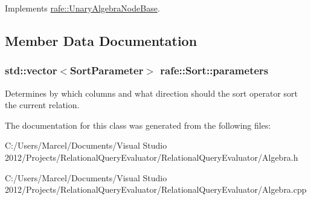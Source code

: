 Implements \hyperlink{classrafe_1_1_unary_algebra_node_base_a6f554aad7250a0f15730d10ae24e4a79}{rafe\+::\+Unary\+Algebra\+Node\+Base}.



\subsection{Member Data Documentation}
\hypertarget{classrafe_1_1_sort_a56fff2e57e874999e0bc44772b090129}{
\subsubsection[{parameters}]{\setlength{\rightskip}{0pt plus 5cm}std\+::vector$<${\bf Sort\+Parameter}$>$ rafe\+::\+Sort\+::parameters}}\label{classrafe_1_1_sort_a56fff2e57e874999e0bc44772b090129}
Determines by which columns and what direction should the sort operator sort the current relation. 

The documentation for this class was generated from the following files\+:\begin{DoxyCompactItemize}
\item 
C\+:/\+Users/\+Marcel/\+Documents/\+Visual Studio 2012/\+Projects/\+Relational\+Query\+Evaluator/\+Relational\+Query\+Evaluator/Algebra.\+h\item 
C\+:/\+Users/\+Marcel/\+Documents/\+Visual Studio 2012/\+Projects/\+Relational\+Query\+Evaluator/\+Relational\+Query\+Evaluator/Algebra.\+cpp\end{DoxyCompactItemize}
